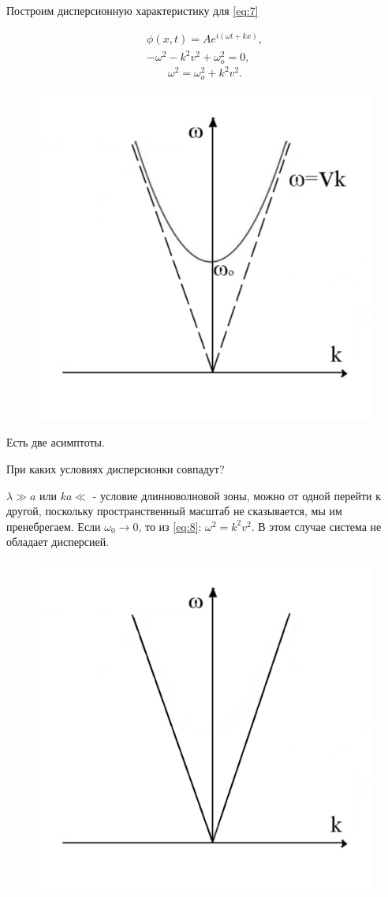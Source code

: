 Построим дисперсионную характеристику для \eqref{eq:7}

\begin{gather*}
	\phi(x,t)=Ae^{i(\omega t + kx)}, \\ -\omega^2-k^2v^2+\omega_o^2=0,
\end{gather*}
\begin{equation}
	\omega^2 = \omega_o^2 + k^2v^2.
	\label{eq:8}
\end{equation}
\begin{figure}[H]
	\centering
	\includegraphics[width=0.5\linewidth]{fig/fig3.pdf}   
\end{figure}

Есть две асимптоты. 

При каких условиях дисперсионки совпадут?

$\lambda\gg a$ или $ka\ll$ - условие длинноволновой зоны, можно от одной перейти к другой, поскольку пространственный масштаб не сказывается, мы им пренебрегаем. Если $\omega_0 \rightarrow 0$, то из \eqref{eq:8}: $\omega^2=k^2v^2$. В этом случае система не обладает дисперсией. 

\begin{figure}[H]
	\centering
	\includegraphics[width=0.5\linewidth]{fig/fig4.pdf}   
\end{figure}

